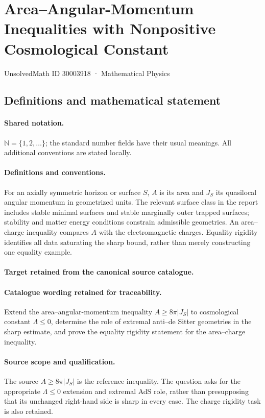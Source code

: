 \documentclass[11pt]{article}
\begin{document}
\setcounter{section}{30003917}
\section{Area–Angular-Momentum Inequalities with Nonpositive Cosmological Constant}\label{30003918}
{\small UnsolvedMath ID 30003918 · Mathematical Physics}
\subsection{Definitions and mathematical statement}

\paragraph{Shared notation.}$\mathbb N=\{1,2,\ldots\}$; the standard number fields have their usual meanings. All additional conventions are stated locally.


\paragraph{Definitions and conventions.}
For an axially symmetric horizon or surface $S$, $A$ is its area and $J_S$ its quasilocal angular momentum in geometrized units. The relevant surface class in the report includes stable minimal surfaces and stable marginally outer trapped surfaces; stability and matter energy conditions constrain admissible geometries. An area--charge inequality compares $A$ with the electromagnetic charges. Equality rigidity identifies all data saturating the sharp bound, rather than merely constructing one equality example.

\paragraph{Target retained from the canonical source catalogue.}
\paragraph{Catalogue wording retained for traceability.}
Extend the area–angular-momentum inequality $A\geq8\pi|J_S|$ to cosmological constant $\Lambda\leq0$, determine the role of extremal anti–de Sitter geometries in the sharp estimate, and prove the equality rigidity statement for the area–charge inequality.

\paragraph{Source scope and qualification.}
The source $A\geq8\pi|J_S|$ is the reference inequality. The question asks for the appropriate $\Lambda\leq0$ extension and extremal AdS role, rather than presupposing that its unchanged right-hand side is sharp in every case. The charge rigidity task is also retained.
\end{document}
